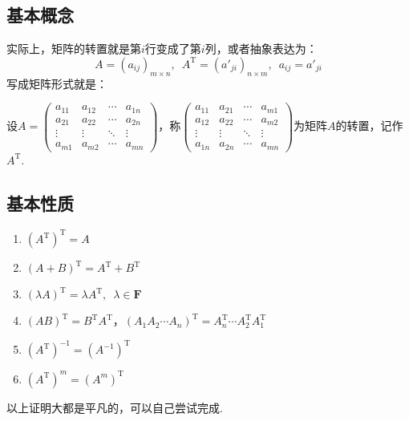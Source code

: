 \subsection{基本概念}
实际上，矩阵的转置就是第$i$行变成了第$i$列，或者抽象表达为：
\[A=(a_{ij})_{m \times n},\enspace A^\mathrm{T}=(a'_{ji})_{n \times m},\enspace a_{ij}=a'_{ji}\]
写成矩阵形式就是：
\begin{definition}
    设$A=\begin{pmatrix}
        a_{11} & a_{12} & \cdots & a_{1n} \\
        a_{21} & a_{22} & \cdots & a_{2n} \\
        \vdots & \vdots & \ddots & \vdots \\
        a_{m1} & a_{m2} & \cdots & a_{mn}
    \end{pmatrix}$，称$\begin{pmatrix}
        a_{11} & a_{21} & \cdots & a_{m1} \\
        a_{12} & a_{22} & \cdots & a_{m2} \\
        \vdots & \vdots & \ddots & \vdots \\
        a_{1n} & a_{2n} & \cdots & a_{mn}
    \end{pmatrix}$为矩阵$A$的转置，记作$A^\mathrm{T}$.
\end{definition}

\subsection{基本性质}
\begin{enumerate}
    \item $(A^\mathrm{T})^\mathrm{T}=A$

    \item $(A+B)^\mathrm{T}=A^\mathrm{T}+B^\mathrm{T}$

    \item $(\lambda A)^\mathrm{T}=\lambda A^\mathrm{T},\enspace \lambda \in \mathbf{F}$

    \item $(AB)^\mathrm{T}=B^\mathrm{T}A^\mathrm{T}$，$(A_1A_2\cdots A_n)^\mathrm{T}=A_n^\mathrm{T}\cdots A_2^\mathrm{T}A_1^\mathrm{T}$

    \item $(A^\mathrm{T})^{-1}=(A^{-1})^\mathrm{T}$

    \item $(A^\mathrm{T})^m=(A^m)^\mathrm{T}$
\end{enumerate}

以上证明大都是平凡的，可以自己尝试完成.
